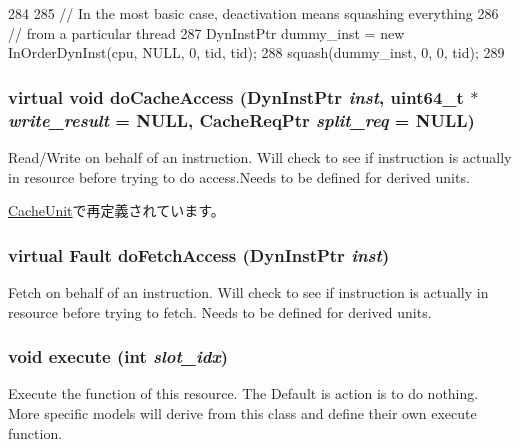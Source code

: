\begin{DoxyCode}
284 {
285     // In the most basic case, deactivation means squashing everything
286     // from a particular thread
287     DynInstPtr dummy_inst = new InOrderDynInst(cpu, NULL, 0, tid, tid);
288     squash(dummy_inst, 0, 0, tid);
289 }
\end{DoxyCode}
\hypertarget{classResource_aa874bbb279acf67627511df8f4c3dce5}{
\subsubsection[{doCacheAccess}]{\setlength{\rightskip}{0pt plus 5cm}virtual void doCacheAccess ({\bf DynInstPtr} {\em inst}, \/  uint64\_\-t $\ast$ {\em write\_\-result} = {\ttfamily NULL}, \/  {\bf CacheReqPtr} {\em split\_\-req} = {\ttfamily NULL})}}
\label{classResource_aa874bbb279acf67627511df8f4c3dce5}
Read/Write on behalf of an instruction. Will check to see if instruction is actually in resource before trying to do access.Needs to be defined for derived units. 

\hyperlink{classCacheUnit_afc4f09d8e36072c3a3c361f2edf108b4}{CacheUnit}で再定義されています。


\hypertarget{classResource_a04a5d185526d3121fee572712fe353ad}{
\subsubsection[{doFetchAccess}]{\setlength{\rightskip}{0pt plus 5cm}virtual {\bf Fault} doFetchAccess ({\bf DynInstPtr} {\em inst})}}
\label{classResource_a04a5d185526d3121fee572712fe353ad}
Fetch on behalf of an instruction. Will check to see if instruction is actually in resource before trying to fetch. Needs to be defined for derived units. 


\hypertarget{classResource_a39af49c5568d1db3f53c12d7d6914c32}{
\subsubsection[{execute}]{\setlength{\rightskip}{0pt plus 5cm}void execute (int {\em slot\_\-idx})}}
\label{classResource_a39af49c5568d1db3f53c12d7d6914c32}
Execute the function of this resource. The Default is action is to do nothing. More specific models will derive from this class and define their own execute function. 

